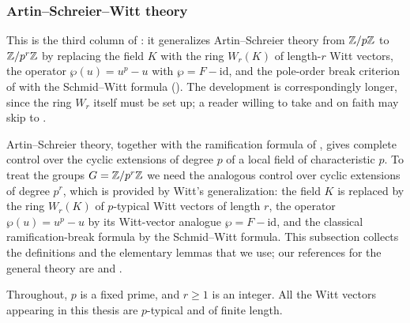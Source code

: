 %
\providecommand{\bW}{\mathbb{W}}

\subsubsection*{Artin--Schreier--Witt theory}
\label{subsection:witt_vector_prerequisites:reorg}
This is the third column of : it
generalizes Artin--Schreier theory from $\mathbb{Z}/p\mathbb{Z}$ to $\mathbb{Z}/p^r\mathbb{Z}$ by replacing the
field $K$ with the ring $W_r(K)$ of length-$r$ Witt vectors, the operator
$\wp(u)=u^p-u$ with $\wp = F-\mathrm{id}$, and the pole-order break criterion of
 with the Schmid--Witt formula
(). The development is
correspondingly longer, since the ring $W_r$ itself must be set up; a reader
willing to take  and
 on faith may skip to
.

Artin--Schreier theory, together with the ramification formula of
, gives complete control over the cyclic
extensions of degree $p$ of a local field of characteristic $p$. To treat the groups
$G = \mathbb{Z}/p^r\mathbb{Z}$ we need the analogous control over cyclic extensions of degree $p^r$,
which is provided by Witt's generalization: the field $K$ is replaced by the ring
$W_r(K)$ of $p$-typical Witt vectors of length $r$, the operator $\wp(u) = u^p - u$ by
its Witt-vector analogue $\wp = F - \mathrm{id}$, and the classical ramification-break
formula by the Schmid--Witt formula. This subsection collects the definitions and the
elementary lemmas that we use; our references for the general theory are
\cite[II, \S6]{serreLF} and \cite{Rabinoff2014Witt}.

Throughout, $p$ is a fixed prime, and $r \geq 1$ is an integer. All the Witt vectors
appearing in this thesis are $p$-typical and of finite length.

